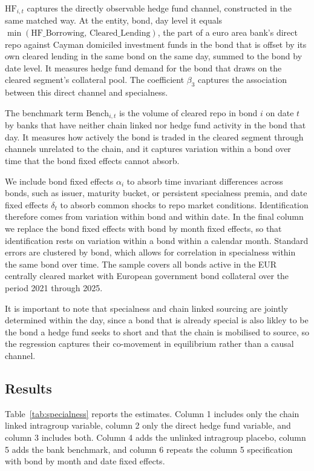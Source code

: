 \documentclass[english, 11pt, oneside, legal]{article}
\begin{document}
$\text{HF}_{i,t}$ captures the directly observable hedge fund channel, constructed in the same matched way. At the entity, bond, day level it equals $\min(\text{HF\_Borrowing},\,\text{Cleared\_Lending})$, the part of a euro area bank's direct repo against Cayman domiciled investment funds in the bond that is offset by its own cleared lending in the same bond on the same day, summed to the bond by date level. It measures hedge fund demand for the bond that draws on the cleared segment's collateral pool. The coefficient $\beta_{3}$ captures the association between this direct channel and specialness.

The benchmark term $\text{Bench}_{i,t}$ is the volume of cleared repo in bond $i$ on date $t$ by banks that have neither chain linked nor hedge fund activity in the bond that day. It measures how actively the bond is traded in the cleared segment through channels unrelated to the chain, and it captures variation within a bond over time that the bond fixed effects cannot absorb. 

We include bond fixed effects $\alpha_{i}$ to absorb time invariant differences across bonds, such as issuer, maturity bucket, or persistent specialness premia, and date fixed effects $\delta_{t}$ to absorb common shocks to repo market conditions. Identification therefore comes from variation within bond and within date. In the final column we replace the bond fixed effects with bond by month fixed effects, so that identification rests on variation within a bond within a calendar month. Standard errors are clustered by bond, which allows for correlation in specialness within the same bond over time. The sample covers all bonds active in the EUR centrally cleared market with European government bond collateral over the period 2021 through 2025.

It is important to note that specialness and chain linked sourcing are jointly determined within the day, since a bond that is already special is also likley to be the bond a hedge fund seeks to short and that the chain is mobilised to source, so the regression captures their co-movement in equilibrium rather than a causal channel.

\subsection{Results}

Table~\ref{tab:specialness} reports the estimates. Column 1 includes only the chain linked intragroup variable, column 2 only the direct hedge fund variable, and column 3 includes both. Column 4 adds the unlinked intragroup placebo, column 5 adds the bank benchmark, and column 6 repeats the column 5 specification with bond by month and date fixed effects.
\end{document}
